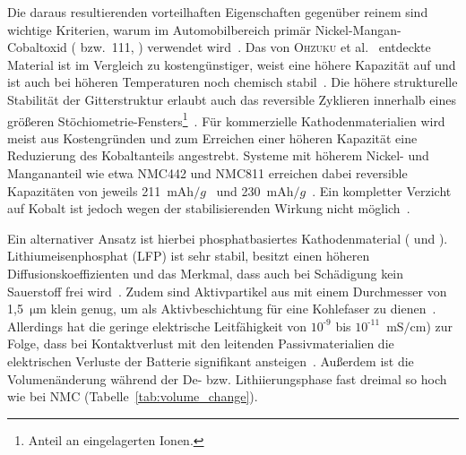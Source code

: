 Die daraus resultierenden vorteilhaften Eigenschaften gegenüber reinem  sind wichtige Kriterien, warum im Automobilbereich primär Nickel-Mangan-Cobaltoxid ( bzw.\ 111, ) verwendet wird~\cite{Burow2016}. Das von \textsc{Ohzuku} et al.~\cite{Ohzuku2001, Yabuuchi2003} entdeckte Material ist im Vergleich zu  kostengünstiger, weist eine höhere Kapazität auf und ist auch bei höheren Temperaturen noch chemisch stabil~\cite{Kim2016,Zheng2012}. 
Die höhere strukturelle Stabilität der Gitterstruktur erlaubt auch das reversible Zyklieren innerhalb eines größeren Stöchiometrie-Fensters\footnote{Anteil an eingelagerten Ionen.}~\cite{Dolotko2014,Choi2005}. 
Für kommerzielle Kathodenmaterialien wird meist aus Kostengründen und zum Erreichen einer höheren Kapazität eine Reduzierung des Kobaltanteils angestrebt. Systeme mit höherem Nickel- und Mangananteil wie etwa NMC442 und NMC811 erreichen dabei reversible Kapazitäten von jeweils 211~$\si{\milli \ampere \hour \per g}$~\cite{Ma2014} und 230~$\si{\milli \ampere \hour \per g}$~\cite{Xue2021}. Ein kompletter Verzicht auf Kobalt ist jedoch wegen der stabilisierenden Wirkung nicht möglich~\cite{Ren2023}.

Ein alternativer Ansatz ist hierbei phosphatbasiertes Kathodenmaterial ( und ). Lithiumeisenphosphat (LFP) ist sehr stabil, besitzt einen höheren Diffusionskoeffizienten und das Merkmal, dass auch bei Schädigung kein Sauerstoff frei wird~\cite{Ling2021}. Zudem sind Aktivpartikel aus  mit einem Durchmesser von 1,5~$\si{\um}$ klein genug, um als Aktivbeschichtung für eine Kohlefaser zu dienen~\cite{Yuecel2023}.
Allerdings hat die geringe elektrische Leitfähigkeit von $10^{\text{-}9}$ bis $10^{\text{-}11}$~$\si{\milli \siemens \per \cm}$) zur Folge, dass bei Kontaktverlust mit den leitenden Passivmaterialien die elektrischen Verluste der Batterie signifikant ansteigen~\cite{Padhi1997}. Außerdem ist die Volumenänderung während der De- bzw. Lithiierungsphase fast dreimal so hoch wie bei NMC (Tabelle~\ref{tab:volume_change}).

